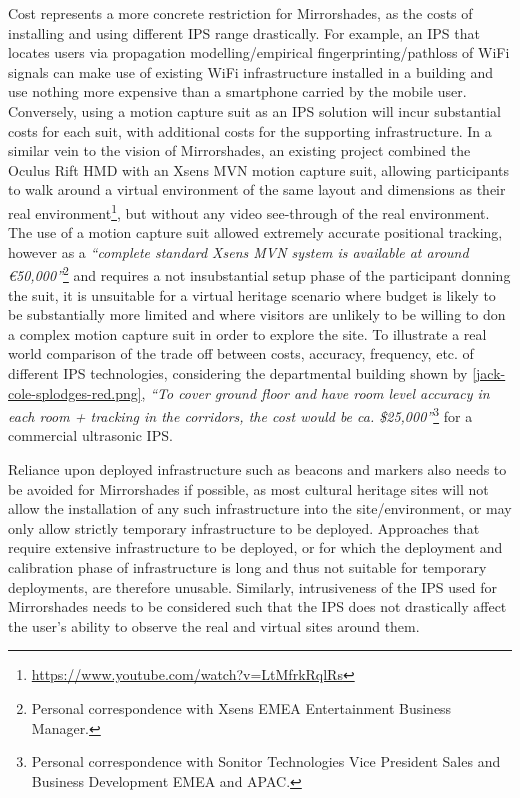 Cost represents a more concrete restriction for Mirrorshades, as the costs of installing and using different IPS range drastically. For example, an IPS that locates users via propagation modelling/empirical fingerprinting/pathloss of WiFi signals can make use of existing WiFi infrastructure installed in a building and use nothing more expensive than a smartphone carried by the mobile user. Conversely, using a motion capture suit as an IPS solution will incur substantial costs for each suit, with additional costs for the supporting infrastructure. In a similar vein to the vision of Mirrorshades, an existing project combined the Oculus Rift HMD with an Xsens MVN motion capture suit, allowing participants to walk around a virtual environment of the same layout and dimensions as their real environment\footnote{\url{https://www.youtube.com/watch?v=LtMfrkRqlRs}}, but without any video see-through of the real environment. The use of a motion capture suit allowed extremely accurate positional tracking, however as a \textit{``complete standard Xsens MVN system is available at around \euro{}50,000''}\footnote{Personal correspondence with Xsens EMEA Entertainment Business Manager.} and requires a not insubstantial setup phase of the participant donning the suit, it is unsuitable for a virtual heritage scenario where budget is likely to be substantially more limited and  where visitors are unlikely to be willing to don a complex motion capture suit in order to explore the site. To illustrate a real world comparison of the trade off between costs, accuracy, frequency, etc. of different IPS technologies, considering the departmental building shown by \ref{jack-cole-splodges-red.png}, \textit{``To cover ground floor and have room level accuracy in each room + tracking in the corridors, the cost would be ca. \$25,000''}\footnote{Personal correspondence with Sonitor Technologies Vice President Sales and Business Development EMEA and APAC.} for a commercial ultrasonic IPS.

Reliance upon deployed infrastructure such as beacons and markers also needs to be avoided for Mirrorshades if possible, as most cultural heritage sites will not allow the installation of any such infrastructure into the site/environment, or may only allow strictly temporary infrastructure to be deployed. Approaches that require extensive infrastructure to be deployed, or for which the deployment and calibration phase of infrastructure is long and thus not suitable for temporary deployments, are therefore unusable. Similarly, intrusiveness of the IPS used for Mirrorshades needs to be considered such that the IPS does not drastically affect the user's ability to observe the real and virtual sites around them.

